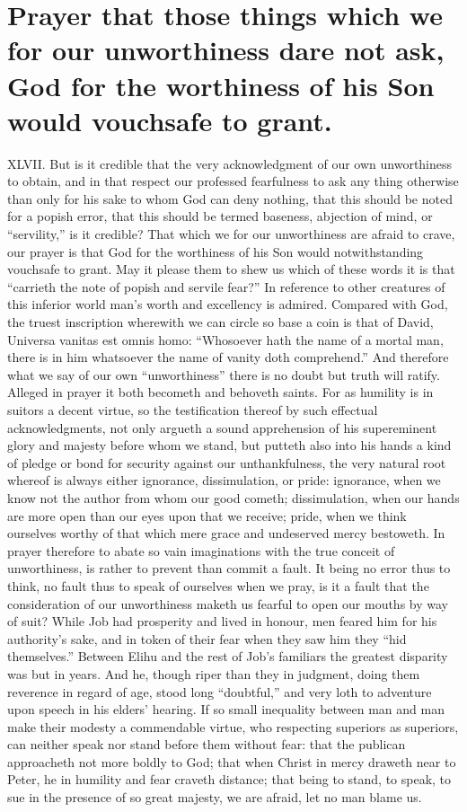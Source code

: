 \section*{Prayer that those things which we for our unworthiness dare not ask, God for the worthiness of his Son would vouchsafe to grant.}
XLVII. But is it credible that the very acknowledgment of our own unworthiness to obtain, and in that respect our professed fearfulness to ask any thing otherwise than only for his sake to whom God can deny nothing, that this should be noted for a popish error, that this should be termed baseness, abjection of mind, or “servility,” is it credible? That which we for our unworthiness are afraid to crave, our prayer is that God for the worthiness of his Son would notwithstanding vouchsafe to grant. May it please them to shew us which of these words it is that “carrieth the note of popish and servile fear?”
In reference to other creatures of this inferior world man’s worth and excellency is admired. Compared with God, the truest inscription wherewith we can circle so base a coin is that of David, Universa vanitas est omnis homo: “Whosoever  hath the name of a mortal man, there is in him whatsoever the name of vanity doth comprehend.” And therefore what we say of our own “unworthiness” there is no doubt but truth will ratify. Alleged in prayer it both becometh and behoveth saints. For as humility is in suitors a decent virtue, so the testification thereof by such effectual acknowledgments, not only argueth a sound apprehension of his supereminent glory and majesty before whom we stand, but putteth also into his hands a kind of pledge or bond for security against our unthankfulness, the very natural root whereof is always either ignorance, dissimulation, or pride: ignorance, when we know not the author from whom our good cometh; dissimulation, when our hands are more open than our eyes upon that we receive; pride, when we think ourselves worthy of that which mere grace and undeserved mercy bestoweth. In prayer therefore to abate so vain imaginations with the true conceit of unworthiness, is rather to prevent than commit a fault.
It being no error thus to think, no fault thus to speak of ourselves when we pray, is it a fault that the consideration of our unworthiness maketh us fearful to open our mouths by way of suit? While Job had prosperity and lived in honour, men feared him for his authority’s sake, and in token of their fear when they saw him they “hid themselves.” Between Elihu and the rest of Job’s familiars the greatest disparity was but in years. And he, though riper than they in judgment, doing them reverence in regard of age, stood long “doubtful,” and very loth to adventure upon speech in his elders’ hearing. If so small inequality between man and man make their modesty a commendable virtue, who respecting superiors as superiors, can neither speak nor stand before them without fear: that the publican approacheth not more boldly to God; that when Christ in mercy draweth near to Peter, he in humility and fear craveth distance; that being to stand, to speak, to sue in the presence of so great majesty, we are afraid, let no man blame us.
